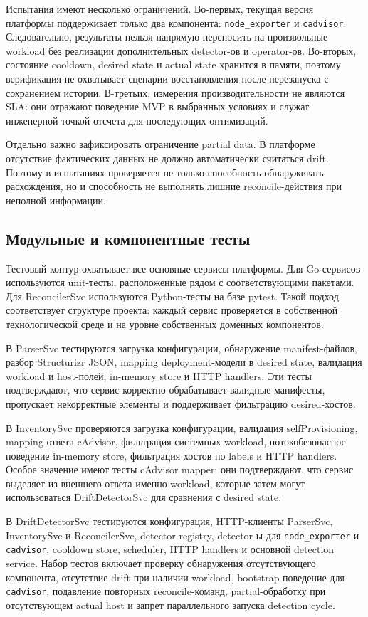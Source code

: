 Испытания имеют несколько ограничений. Во-первых, текущая версия платформы поддерживает только два компонента: \texttt{node\_exporter} и \texttt{cadvisor}. Следовательно, результаты нельзя напрямую переносить на произвольные workload без реализации дополнительных detector-ов и operator-ов. Во-вторых, состояние cooldown, desired state и actual state хранится в памяти, поэтому верификация не охватывает сценарии восстановления после перезапуска с сохранением истории. В-третьих, измерения производительности не являются SLA: они отражают поведение MVP в выбранных условиях и служат инженерной точкой отсчета для последующих оптимизаций.

Отдельно важно зафиксировать ограничение partial data. В платформе отсутствие фактических данных не должно автоматически считаться drift. Поэтому в испытаниях проверяется не только способность обнаруживать расхождения, но и способность не выполнять лишние reconcile-действия при неполной информации.

\subsection{Модульные и компонентные тесты}

Тестовый контур охватывает все основные сервисы платформы. Для Go-сервисов используются unit-тесты, расположенные рядом с соответствующими пакетами. Для ReconcilerSvc используются Python-тесты на базе pytest. Такой подход соответствует структуре проекта: каждый сервис проверяется в собственной технологической среде и на уровне собственных доменных компонентов.

В ParserSvc тестируются загрузка конфигурации, обнаружение manifest-файлов, разбор Structurizr JSON, mapping deployment-модели в desired state, валидация workload и host-полей, in-memory store и HTTP handlers. Эти тесты подтверждают, что сервис корректно обрабатывает валидные манифесты, пропускает некорректные элементы и поддерживает фильтрацию desired-хостов.

В InventorySvc проверяются загрузка конфигурации, валидация selfProvisioning, mapping ответа cAdvisor, фильтрация системных workload, потокобезопасное поведение in-memory store, фильтрация хостов по labels и HTTP handlers. Особое значение имеют тесты cAdvisor mapper: они подтверждают, что сервис выделяет из внешнего ответа именно workload, которые затем могут использоваться DriftDetectorSvc для сравнения с desired state.

В DriftDetectorSvc тестируются конфигурация, HTTP-клиенты ParserSvc, InventorySvc и ReconcilerSvc, detector registry, detector-ы для \texttt{node\_exporter} и \texttt{cadvisor}, cooldown store, scheduler, HTTP handlers и основной detection service. Набор тестов включает проверку обнаружения отсутствующего компонента, отсутствие drift при наличии workload, bootstrap-поведение для \texttt{cadvisor}, подавление повторных reconcile-команд, partial-обработку при отсутствующем actual host и запрет параллельного запуска detection cycle.

